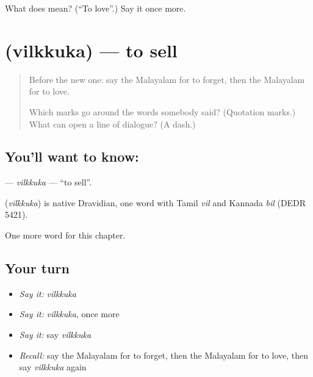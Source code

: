 \begin{tcolorbox}[breakable,colback=teal!4,colframe=teal!35!black,title={Before you move on}]
What does  mean? (\textquotedblleft{}To love\textquotedblright{}.) Say it once more.
\end{tcolorbox}
\section[\texorpdfstring{\ml{വിൽക്കുക} (vilkkuka)}{വിൽക്കുക (vilkkuka)}]{ (vilkkuka) — to sell}

\label{lesson:ML-C175-vilkkuka}



\begin{quote}
Before the new one: say the Malayalam for to forget, then the Malayalam for to love.

Which marks go around the words somebody said? (Quotation marks.) What can open a line of dialogue? (A dash.)
\end{quote}

\subsection*{You'll want to know: }
\textbf{} — \emph{vilkkuka} — \textquotedblleft{}to sell\textquotedblright{}.

\begin{cousinweb}
\textbf{} (\emph{vilkkuka}) is native Dravidian, one word with Tamil \emph{vil} and Kannada \emph{bil} (DEDR 5421).
\end{cousinweb}

\begin{grammarlens}[title={What you've built}]
One more word for this chapter.
\end{grammarlens}

\subsection*{Your turn}
\begin{itemize}
\raggedright
  \item \emph{Say it:} \emph{vilkkuka}
  \item \emph{Say it:} \emph{vilkkuka}, once more
  \item \emph{Say it:} say \emph{vilkkuka}
  \item \emph{Recall:} say the Malayalam for to forget, then the Malayalam for to love, then say \emph{vilkkuka} again
\end{itemize}

